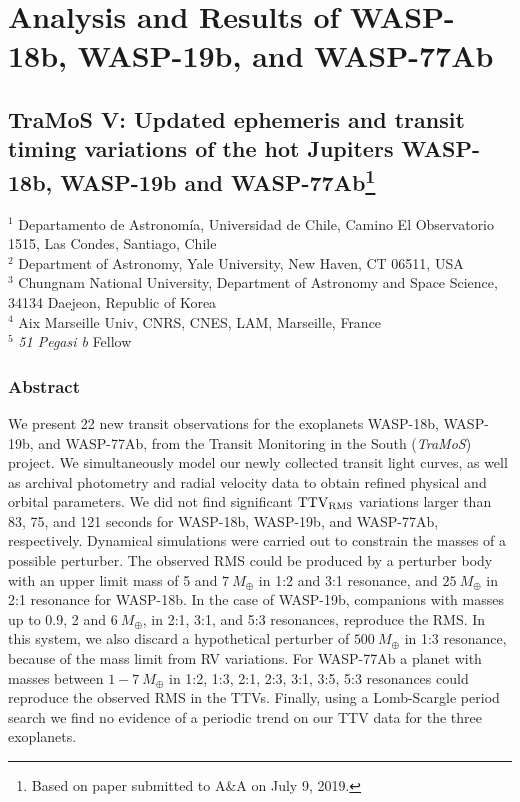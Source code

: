 \chapter{Analysis and Results of WASP-18b, WASP-19b, and WASP-77Ab}\label{chap:paper}

\section*{TraMoS V: Updated ephemeris and transit timing variations of the hot Jupiters WASP-18b, WASP-19b and WASP-77Ab\footnote{Based on paper submitted to A\&A on July 9, 2019.}}


\begin{flushleft}
\vspace{-1cm}
$^{1}$ Departamento de Astronom\'ia, Universidad de Chile, Camino El Observatorio 1515, Las Condes, Santiago, Chile \\
$^{2}$ Department of Astronomy, Yale University, New Haven, CT 06511, USA \\
$^{3}$ Chungnam National University, Department of Astronomy and Space Science, 34134 Daejeon, Republic of Korea \\ 
$^{4}$ Aix Marseille Univ, CNRS, CNES, LAM, Marseille, France \\
$^{5}$ \emph{51 Pegasi b} Fellow \\
\end{flushleft}

\subsection*{Abstract}

We present 22 new transit observations for the exoplanets WASP-18b, WASP-19b, and WASP-77Ab, from the Transit Monitoring in the South (\emph{TraMoS}) project. We simultaneously model our newly collected transit light curves, as well as archival photometry and radial velocity data to obtain refined physical and orbital parameters. We did not find significant $\rm TTV_{RMS}$ variations larger than 83, 75, and 121 seconds for WASP-18b, WASP-19b, and WASP-77Ab, respectively. Dynamical simulations were carried out to constrain the masses of a possible perturber. The observed RMS could be produced by a perturber body with an upper limit mass of 5 and $7~M_{\oplus}$ in 1:2 and 3:1 resonance, and $25~M_{\oplus}$ in 2:1 resonance for WASP-18b. In the case of WASP-19b, companions with masses up to 0.9, 2 and $6~M_{\oplus}$, in 2:1, 3:1, and 5:3 resonances, reproduce the RMS. In this system, we also discard a hypothetical perturber of $500~M_{\oplus}$ in 1:3 resonance, because of the mass limit from RV variations. For WASP-77Ab a planet with masses between $1-7~M_{\oplus}$ in 1:2, 1:3, 2:1, 2:3, 3:1, 3:5, 5:3 resonances could reproduce the observed RMS in the TTVs. Finally, using a Lomb-Scargle period search we find no evidence of a periodic trend on our TTV data for the three exoplanets.

